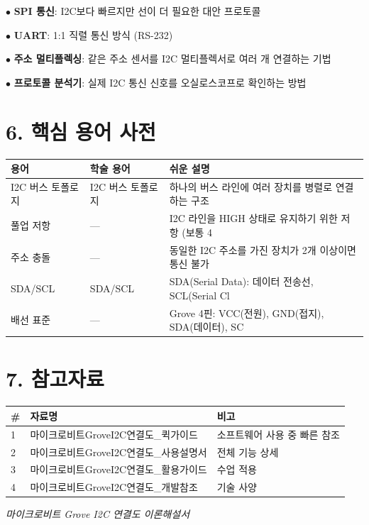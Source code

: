 \documentclass[11pt,a4paper]{article}
\begin{document}
$\bullet$ \textbf{SPI 통신}: I2C보다 빠르지만 선이 더 필요한 대안 프로토콜

$\bullet$ \textbf{UART}: 1:1 직렬 통신 방식 (RS-232)

$\bullet$ \textbf{주소 멀티플렉싱}: 같은 주소 센서를 I2C 멀티플렉서로 여러 개 연결하는 기법

$\bullet$ \textbf{프로토콜 분석기}: 실제 I2C 통신 신호를 오실로스코프로 확인하는 방법



\section*{6. 핵심 용어 사전}

\begin{center}
\renewcommand{\arraystretch}{1.4}
\begin{tabular}{|p{3.0cm}|p{3.0cm}|p{9.1cm}|}
\hline
\rowcolor{tableheader}
\textbf{용어} & \textbf{학술 용어} & \textbf{쉬운 설명} \\
\hline
I2C 버스 토폴로지 & I2C 버스 토폴로지 & 하나의 버스 라인에 여러 장치를 병렬로 연결하는 구조 \\
\hline
풀업 저항 & — & I2C 라인을 HIGH 상태로 유지하기 위한 저항 (보통 4 \\
\hline
주소 충돌 & — & 동일한 I2C 주소를 가진 장치가 2개 이상이면 통신 불가 \\
\hline
SDA/SCL & SDA/SCL & SDA(Serial Data): 데이터 전송선, SCL(Serial Cl \\
\hline
배선 표준 & — & Grove 4핀: VCC(전원), GND(접지), SDA(데이터), SC \\
\hline
\end{tabular}
\end{center}


\section*{7. 참고자료}

\begin{center}
\renewcommand{\arraystretch}{1.4}
\begin{tabular}{|p{1.5cm}|p{7.3cm}|p{6.2cm}|}
\hline
\rowcolor{tableheader}
\textbf{\#} & \textbf{자료명} & \textbf{비고} \\
\hline
1 & 마이크로비트GroveI2C연결도\_퀵가이드 & 소프트웨어 사용 중 빠른 참조 \\
\hline
2 & 마이크로비트GroveI2C연결도\_사용설명서 & 전체 기능 상세 \\
\hline
3 & 마이크로비트GroveI2C연결도\_활용가이드 & 수업 적용 \\
\hline
4 & 마이크로비트GroveI2C연결도\_개발참조 & 기술 사양 \\
\hline
\end{tabular}
\end{center}


\vfill
\begin{center}
\small\color{lightbrown}
\textit{마이크로비트 Grove I2C 연결도 이론해설서}
\end{center}
\end{document}
